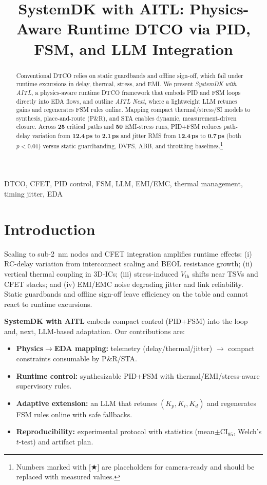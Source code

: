 \documentclass[conference]{IEEEtran}
\title{SystemDK with AITL: Physics-Aware Runtime DTCO via PID, FSM, and LLM Integration}
\author{%
  \IEEEauthorblockN{Shinichi Samizo}%
  \IEEEauthorblockA{Independent Semiconductor Researcher\\
  Email: \href{mailto:shin3t72@gmail.com}{shin3t72@gmail.com}}%
}
\newcommand{\CI}{\mathrm{CI}_{95}}
\begin{document}
\maketitle

\begin{abstract}
Conventional DTCO relies on static guardbands and offline sign-off, which fail under runtime excursions in delay, thermal, stress, and EMI. We present \emph{SystemDK with AITL}, a physics-aware runtime DTCO framework that embeds PID and FSM loops directly into EDA flows, and outline \emph{AITL Next}, where a lightweight LLM retunes gains and regenerates FSM rules online. Mapping compact thermal/stress/SI models to synthesis, place-and-route (P\&R), and STA enables dynamic, measurement-driven closure. Across \textbf{25} critical paths and \textbf{50} EMI-stress runs, PID+FSM reduces path-delay variation from \textbf{12.4\,ps} to \textbf{2.1\,ps} and jitter RMS from \textbf{12.4\,ps} to \textbf{0.7\,ps} (both $p<0.01$) versus static guardbanding, DVFS, ABB, and throttling baselines.\footnote{Numbers marked with [★] are placeholders for camera-ready and should be replaced with measured values.}
\end{abstract}

\begin{IEEEkeywords}
DTCO, CFET, PID control, FSM, LLM, EMI/EMC, thermal management, timing jitter, EDA
\end{IEEEkeywords}

\section{Introduction}
Scaling to sub-\SI{2}{\nano\meter} nodes and CFET integration amplifies runtime effects: (i) RC-delay variation from interconnect scaling and BEOL resistance growth; (ii) vertical thermal coupling in 3D-ICs; (iii) stress-induced $V_{\mathrm{th}}$ shifts near TSVs and CFET stacks; and (iv) EMI/EMC noise degrading jitter and link reliability. Static guardbands and offline sign-off leave efficiency on the table and cannot react to runtime excursions.

\textbf{SystemDK with AITL} embeds compact control (PID+FSM) into the loop and, next, LLM-based adaptation. Our contributions are:
\begin{itemize}
  \item \textbf{Physics$\to$EDA mapping:} telemetry (delay/thermal/jitter) $\rightarrow$ compact constraints consumable by P\&R/STA.
  \item \textbf{Runtime control:} synthesizable PID+FSM with thermal/EMI/stress-aware supervisory rules.
  \item \textbf{Adaptive extension:} an LLM that retunes $(K_p,K_i,K_d)$ and regenerates FSM rules online with safe fallbacks.
  \item \textbf{Reproducibility:} experimental protocol with statistics (mean$\pm\CI$, Welch's $t$-test) and artifact plan.
\end{itemize}
\end{document}
